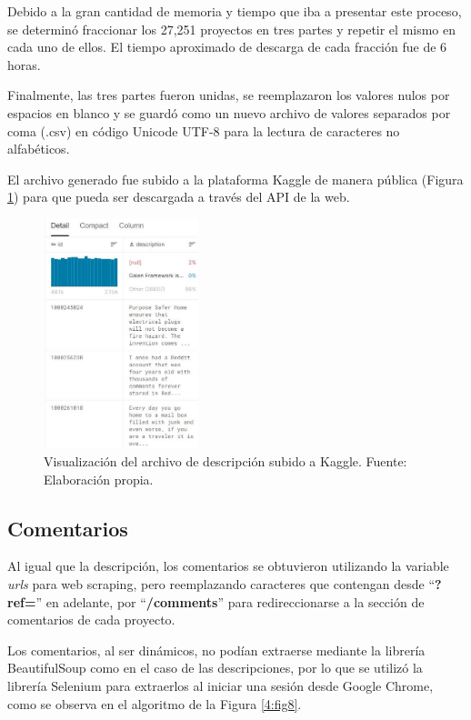 Debido a la gran cantidad de memoria y tiempo que iba a presentar este proceso, se determinó fraccionar los 27,251 proyectos en tres partes y repetir el mismo en cada uno de ellos. El tiempo aproximado de descarga de cada fracción fue de 6 horas.

Finalmente, las tres partes fueron unidas, se reemplazaron los valores nulos por espacios en blanco y se guardó como un nuevo archivo de valores separados por coma (.csv) en código Unicode UTF-8 para la lectura de caracteres no alfabéticos.

El archivo generado fue subido a la plataforma Kaggle de manera pública (Figura \ref{4:fig7}) para que pueda ser descargada a través del API de la web.

\begin{figure}[!ht]
	\begin{center}
		\includegraphics[width=0.4\textwidth]{4/figures/description_kaggle_preview.jpg}
		\caption{Visualización del archivo de descripción subido a Kaggle. Fuente: Elaboración propia.}
		\label{4:fig7}
	\end{center}
\end{figure}

\subsection{Comentarios}
Al igual que la descripción, los comentarios se obtuvieron utilizando la variable \textit{urls} para web scraping, pero reemplazando caracteres que contengan desde “\textbf{?ref=}” en adelante, por “\textbf{/comments}” para redireccionarse a la sección de comentarios de cada proyecto.

Los comentarios, al ser dinámicos, no podían extraerse mediante la librería BeautifulSoup como en el caso de las descripciones, por lo que se utilizó la librería Selenium para extraerlos al iniciar una sesión desde Google Chrome, como se observa en el algoritmo de la Figura \ref{4:fig8}.

